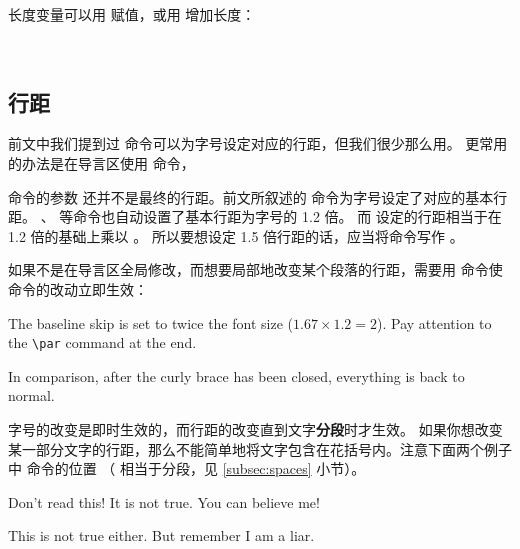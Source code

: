 长度变量可以用  赋值，或用  增加长度：
\begin{command}
 \\
\end{command}

\subsection{行距}\label{subsec:linespread}

前文中我们提到过  命令可以为字号设定对应的行距，但我们很少那么用。
更常用的办法是在导言区使用  命令，
\begin{command}
\end{command}

 命令的参数  还并不是最终的行距。前文所叙述的  命令为字号设定了对应的基本行距。
、 等命令也自动设置了基本行距为字号的 1.2 倍。
而  设定的行距相当于在 1.2 倍的基础上乘以 。
所以要想设定 1.5 倍行距的话，应当将命令写作  。

如果不是在导言区全局修改，而想要局部地改变某个段落的行距，需要用  命令使  命令的改动立即生效：
\begin{example}
{\linespread{1.67}\selectfont
The baseline skip is set to twice
the font size ($1.67\times 1.2=2$). 
Pay attention to the \verb|\par|
command at the end. \par}

In comparison, after the
curly brace has been closed,
everything is back to normal.
\end{example}

字号的改变是即时生效的，而行距的改变直到文字\textbf{分段}时才生效。
如果你想改变某一部分文字的行距，那么不能简单地将文字包含在花括号内。注意下面两个例子中  命令的位置
（ 相当于分段，见 \ref{subsec:spaces} 小节）。
\begin{example}
{\Large Don't read this!
 It is not true.
 You can believe me!\par}
\end{example}

\begin{example}
{\Large This is not true either.
But remember I am a liar.}\par
\end{example}

